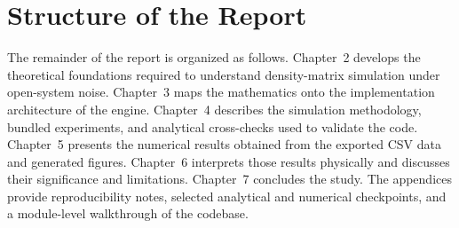 \section{Structure of the Report}

The remainder of the report is organized as follows. Chapter~2 develops the theoretical foundations required to understand density-matrix simulation under open-system noise. Chapter~3 maps the mathematics onto the implementation architecture of the engine. Chapter~4 describes the simulation methodology, bundled experiments, and analytical cross-checks used to validate the code. Chapter~5 presents the numerical results obtained from the exported CSV data and generated figures. Chapter~6 interprets those results physically and discusses their significance and limitations. Chapter~7 concludes the study. The appendices provide reproducibility notes, selected analytical and numerical checkpoints, and a module-level walkthrough of the codebase.
